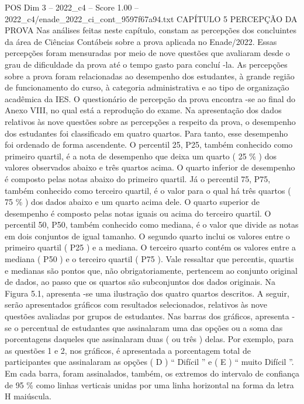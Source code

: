 \begin{textsample}{POS Dim 3 – 2022\_c4 – Score 1.00 – 2022\_c4/enade\_2022\_ci\_cont\_9597f67a94.txt}  \label{ex:f3_pos_171}
CAPÍTULO 5 PERCEPÇÃO DA PROVA Nas análises feitas neste capítulo, constam as percepções dos concluintes da área de Ciências Contábeis sobre a prova aplicada no Enade/2022.
Essas percepções foram mensuradas por meio de nove questões que avaliaram desde o grau de dificuldade da prova até o tempo gasto para concluí -la.
As percepções sobre a prova foram relacionadas ao desempenho dos estudantes, à grande região de funcionamento do curso, à categoria administrativa e ao tipo de organização acadêmica da IES.
O questionário de percepção da prova encontra -se ao final do Anexo VIII, no qual está a reprodução do exame.
Na apresentação dos dados relativos às nove questões sobre as percepções a respeito da prova, o desempenho dos estudantes foi classificado em quatro quartos.
Para tanto, esse desempenho foi ordenado de forma ascendente.
O percentil 25, P25, também conhecido como primeiro quartil, é a nota de desempenho que deixa um quarto ( 25 \% ) dos valores observados abaixo e três quartos acima.
O quarto inferior de desempenho é composto pelas notas abaixo do primeiro quartil.
Já o percentil 75, P75, também conhecido como terceiro quartil, é o valor para o qual há três quartos ( 75 \% ) dos dados abaixo e um quarto acima dele.
O quarto superior de desempenho é composto pelas notas iguais ou acima do terceiro quartil.
O percentil 50, P50, também conhecido como mediana, é o valor que divide as notas em dois conjuntos de igual tamanho.
O segundo quarto inclui os valores entre o primeiro quartil ( P25 ) e a mediana.
O terceiro quarto contém os valores entre a mediana ( P50 ) e o terceiro quartil ( P75 ).
Vale ressaltar que percentis, quartis e medianas são pontos que, não obrigatoriamente, pertencem ao conjunto original de dados, ao passo que os quartos são subconjuntos dos dados originais.
Na Figura 5.1, apresenta -se uma ilustração dos quatro quartos descritos.
A seguir, serão apresentados gráficos com resultados selecionados, relativos às nove questões avaliadas por grupos de estudantes.
Nas barras dos gráficos, apresenta -se o percentual de estudantes que assinalaram uma das opções ou a soma das porcentagens daqueles que assinalaram duas ( ou três ) delas.
Por exemplo, para as questões 1 e 2, nos gráficos, é apresentada a porcentagem total de participantes que assinalaram as opções ( D ) “ Difícil ” e ( E ) “ muito Difícil ”.
Em cada barra, foram assinalados, também, os extremos do intervalo de confiança de 95 \% como linhas verticais unidas por uma linha horizontal na forma da letra H maiúscula.

\end{textsample}
